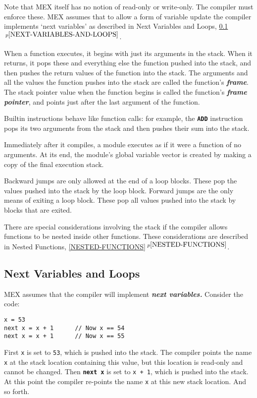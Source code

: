 \documentclass[12pt]{article}
\newcommand{\TT}[1]{{\tt \bfseries #1}}
\newcommand{\key}[1]{{\bf \em #1}\index{#1}}
\newcommand{\skey}[2]{{\bf \em #1#2}\index{#1}}
\newcommand{\itemref}[1]{\ref{#1}$\,^{p\pageref{#1}}$}
\newenvironment{indpar}[1][0.3in]%
	{\begin{list}{}%
		     {\setlength{\itemsep}{0in}%
		      \setlength{\topsep}{0in}%
		      \setlength{\parsep}{1ex}%
		      \setlength{\labelwidth}{#1}%
		      \setlength{\leftmargin}{#1}%
		      \addtolength{\leftmargin}{\labelsep}}%
	 \item}%
	{\end{list}}
\begin{document}
Note that MEX itself has no notion of read-only or write-only.
The compiler must enforce these.  MEX assumes that to allow
a form of variable update the compiler implements `next variables'
as described in Next Variables and Loops, \itemref{NEXT-VARIABLES-AND-LOOPS}.

When a function executes, it begins with just its arguments
in the stack.  When it returns, it pops these and everything
else the function pushed into the stack, and then pushes
the return values of the function into the stack.
The arguments and all the values the function pushes into the
stack are called the function's \key{frame}.  The stack pointer
value when the function begins is called the function's
\key{frame pointer}, and points just after the last argument
of the function.

Builtin instructions behave like function calls: for example,
the \TT{ADD} instruction pops its two arguments from the stack
and then pushes their sum into the stack.

Immediately after it compiles, a module executes as if it were a function
of no arguments.  At its end, the module's
global variable vector is created by making
a copy of the final execution stack.

Backward jumps are only allowed at the end of a loop blocks.
These pop the values pushed into the stack by the loop block.
Forward jumps are the only means of exiting a loop block.  These
pop all values pushed into the stack by blocks that are exited.

There are special considerations involving the stack if the
compiler allows functions to be nested inside other functions.
These considerations are described in Nested Functions,
\itemref{NESTED-FUNCTIONS}.

\subsection{Next Variables and Loops}
\label{NEXT-VARIABLES-AND-LOOPS}

MEX assumes that the compiler will implement \skey{next variables}.
Consider the code:
\begin{indpar}\begin{verbatim}
x = 53
next x = x + 1      // Now x == 54
next x = x + 1      // Now x == 55
\end{verbatim}\end{indpar}
First {\tt x} is set to {\tt 53}, which is pushed into the stack.
The compiler points the name
{\tt x} at the stack location containing this value,
but this location is read-only and cannot be changed.
Then \TT{next x} is set to {\tt x + 1}, which is pushed into the stack.
At this point the compiler re-points the name {\tt x} at this new
stack location.  And so forth.
\end{document}
